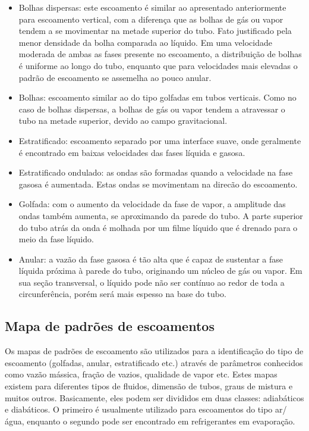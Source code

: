 \begin{itemize}
	\item Bolhas dispersas: este escoamento é similar ao apresentado
	anteriormente para escoamento vertical, com a diferença que as
	bolhas de gás ou vapor tendem a se movimentar na metade superior do
	tubo. Fato justificado pela menor densidade da bolha comparada ao
	líquido. Em uma velocidade moderada de ambas as fases presente no
	escoamento, a distribuição de bolhas é uniforme ao longo do tubo,
	enquanto que para velocidades mais elevadas o padrão de escoamento
	se assemelha ao pouco anular.
	\item Bolhas: escoamento similar ao do tipo golfadas em tubos
	verticais. Como no caso de bolhas dispersas, a bolhas de gás ou
	vapor tendem a atravessar o tubo na metade superior, devido ao campo
	gravitacional.
	\item Estratificado: escoamento separado por uma interface suave,
	onde geralmente é encontrado em baixas velocidades das fases líquida
	e gasosa.
	\item Estratificado ondulado: as ondas são formadas quando a
	velocidade na fase gasosa é aumentada. Estas ondas se movimentam na
	direcão do escoamento.  
	\item Golfada: com o aumento da velocidade da fase de vapor, a
	amplitude das ondas também aumenta, se aproximando da parede do
	tubo. A parte superior do tubo atrás da onda é molhada por um filme
	líquido que é drenado para o meio da fase líquido.
	\item Anular: a vazão da fase gasosa é tão alta que é capaz de
	sustentar a fase líquida próxima à parede do tubo, originando um
	núcleo de gás ou vapor. Em sua seção transversal, o líquido pode não
	ser contínuo ao redor de toda a circunferência, porém será mais
	espesso na base do tubo.
\end{itemize}

\subsection{Mapa de padrões de escoamentos}
Os mapas de padrões de escoamento são utilizados para a identificação do
tipo de escoamento (golfadas, anular, estratificado etc.) através de
parâmetros conhecidos como vazão mássica, fração de vazios, qualidade de
vapor etc. Estes mapas existem para diferentes tipos de fluidos,
dimensão de tubos, graus de mistura e muitos outros. Basicamente, eles
podem ser divididos em duas classes: adiabáticos e diabáticos. O
primeiro é usualmente utilizado para escoamentos do tipo ar/água,
enquanto o segundo pode ser encontrado em refrigerantes em evaporação. 

